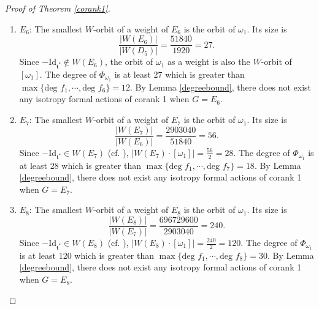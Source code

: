 \documentclass[11pt]{amsart}
\theoremstyle{plain}
\theoremstyle{definition}
\begin{document}
\begin{proof}[Proof of Theorem \ref{corank1}]
\begin{enumerate}
\begin{align*}
			|W\cdot\omega_2|&=|W\cdot\omega_3|=\frac{|W(F_4)|}{|W(A_1\times A_2)|}=\frac{1152}{2\cdot 6}=96\\
			|W\cdot\omega_4|&=\frac{|W(F_4)|}{|W(C_3)|}=\frac{1152}{2^3\cdot 3!}=24
		\end{align*}
		Thus the $W$-orbits of $\omega_1$ and $\omega_4$ are the smallest. Since $-\text{Id}_{\mathfrak{t}^*}\in W(F_4)$ (cf. \cite{Bo}), $|W(F_4)\cdot[\omega_i]|=\frac{24}{2}=12$ for $i=1, 4$. The degree of $\Phi_{\omega_i}$ for $i=1$ and $4$ is $12\cdot 2=24$ because $\displaystyle\prod_{w\in W/W_{[\omega_i]}}w\omega_i$ is $W$-anti-invariant. However, $\max\{\text{deg }f_1, \cdots, \text{deg }f_4\}=12$. By Lemma \ref{degreebound}, there does not exist any isotropy formal action of corank 1 when $G=F_4$.
		\item $E_6$: The smallest $W$-orbit of a weight of $E_6$ is the orbit of $\omega_1$. Its size is
		\[\frac{|W(E_6)|}{|W(D_5)|}=\frac{51840}{1920}=27.\]
		Since $-\text{Id}_{\mathfrak{t}^*}\notin W(E_6)$, the orbit of $\omega_1$ as a weight is also the $W$-orbit of $[\omega_1]$. The degree of $\Phi_{\omega_1}$ is at least 27 which is greater than $\max\{\text{deg }f_1, \cdots, \text{deg }f_6\}=12$. By Lemma \ref{degreebound}, there does not exist any isotropy formal actions of corank 1 when $G=E_6$.
		\item $E_7$: The smallest $W$-orbit of a weight of $E_7$ is the orbit of $\omega_1$. Its size is
		\[\frac{|W(E_7)|}{|W(E_6)|}=\frac{2903040}{51840}=56.\]
		Since $-\text{Id}_{\mathfrak{t}^*}\in W(E_7)$ (cf. \cite{Bo}), $|W(E_7)\cdot[\omega_1]|=\frac{56}{2}=28$. The degree of $\Phi_{\omega_1}$ is at least 28 which is greater than $\max\{\text{deg }f_1, \cdots, \text{deg }f_7\}=18$. By Lemma \ref{degreebound}, there does not exist any isotropy formal actions of corank 1 when $G=E_7$.
		\item $E_8$: The smallest $W$-orbit of a weight of $E_8$ is the orbit of $\omega_1$. Its size is
		\[\frac{|W(E_8)|}{|W(E_7)|}=\frac{696729600}{2903040}=240.\]
		Since $-\text{Id}_{\mathfrak{t}^*}\in W(E_8)$ (cf. \cite{Bo}), $|W(E_8)\cdot[\omega_1]|=\frac{240}{2}=120$. The degree of $\Phi_{\omega_1}$ is at least 120 which is greater than $\max\{\text{deg }f_1, \cdots, \text{deg }f_8\}=30$. By Lemma \ref{degreebound}, there does not exist any isotropy formal actions of corank 1 when $G=E_8$.
	\end{enumerate}
\end{proof}
\end{document}
